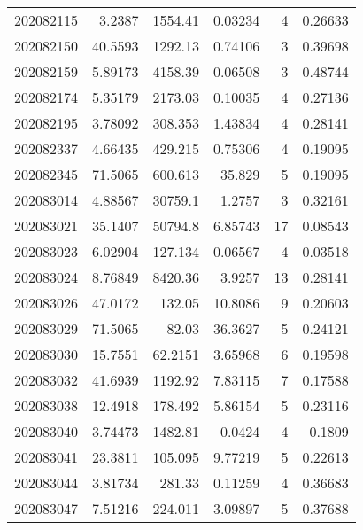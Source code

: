 \begin{tabular}{rrrrrr}
 202082115 &          3.2387  &     1554.41   &            0.03234 &           4 & 0.26633 \\
 202082150 &         40.5593  &     1292.13   &            0.74106 &           3 & 0.39698 \\
 202082159 &          5.89173 &     4158.39   &            0.06508 &           3 & 0.48744 \\
 202082174 &          5.35179 &     2173.03   &            0.10035 &           4 & 0.27136 \\
 202082195 &          3.78092 &      308.353  &            1.43834 &           4 & 0.28141 \\
 202082337 &          4.66435 &      429.215  &            0.75306 &           4 & 0.19095 \\
 202082345 &         71.5065  &      600.613  &           35.829   &           5 & 0.19095 \\
 202083014 &          4.88567 &    30759.1    &            1.2757  &           3 & 0.32161 \\
 202083021 &         35.1407  &    50794.8    &            6.85743 &          17 & 0.08543 \\
 202083023 &          6.02904 &      127.134  &            0.06567 &           4 & 0.03518 \\
 202083024 &          8.76849 &     8420.36   &            3.9257  &          13 & 0.28141 \\
 202083026 &         47.0172  &      132.05   &           10.8086  &           9 & 0.20603 \\
 202083029 &         71.5065  &       82.03   &           36.3627  &           5 & 0.24121 \\
 202083030 &         15.7551  &       62.2151 &            3.65968 &           6 & 0.19598 \\
 202083032 &         41.6939  &     1192.92   &            7.83115 &           7 & 0.17588 \\
 202083038 &         12.4918  &      178.492  &            5.86154 &           5 & 0.23116 \\
 202083040 &          3.74473 &     1482.81   &            0.0424  &           4 & 0.1809  \\
 202083041 &         23.3811  &      105.095  &            9.77219 &           5 & 0.22613 \\
 202083044 &          3.81734 &      281.33   &            0.11259 &           4 & 0.36683 \\
 202083047 &          7.51216 &      224.011  &            3.09897 &           5 & 0.37688 \\

\end{tabular}
